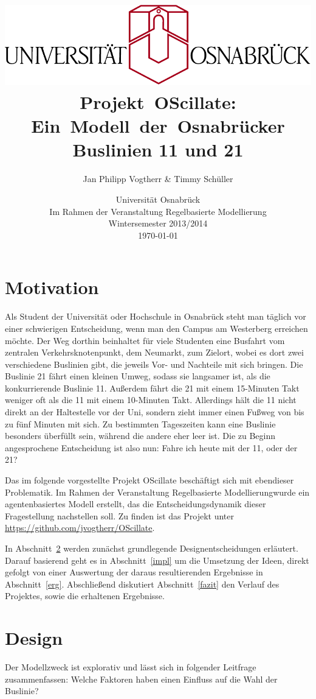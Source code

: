 \documentclass[12pt,a4paper]{scrartcl}
\author{Jan Philipp Vogtherr \& Timmy Schüller\vspace{0.5cm}}
\title{\includegraphics[scale=0.8]{unilogo.pdf}\vspace*{1cm}
\mbox{Projekt OScillate:} \mbox{Ein Modell der Osnabrücker} Buslinien 11 und 21\vspace{0.3cm}}
\date{Universität Osnabrück \\
Im Rahmen der Veranstaltung \glqq Regelbasierte Modellierung\grqq \\
\vspace*{0.4cm}
Wintersemester 2013/2014 \\
\today}
\begin{document}
\maketitle
\thispagestyle{empty}
\newpage
\tableofcontents
\newpage

\section{Motivation}
Als Student der Universität oder Hochschule in Osnabrück steht man täglich vor einer schwierigen Entscheidung, wenn man den Campus am Westerberg erreichen möchte. Der Weg dorthin beinhaltet für viele Studenten eine Busfahrt vom zentralen Verkehrsknotenpunkt, dem Neumarkt, zum Zielort, wobei es dort zwei verschiedene Buslinien gibt, die jeweils Vor- und Nachteile mit sich bringen. Die Buslinie 21 fährt einen kleinen Umweg, sodass sie langsamer ist, als die konkurrierende Buslinie 11. Außerdem fährt die 21 mit einem 15-Minuten Takt weniger oft als die 11 mit einem 10-Minuten Takt. Allerdings hält die 11 nicht direkt an der Haltestelle vor der Uni, sondern zieht immer einen Fußweg von bis zu fünf Minuten mit sich. Zu bestimmten Tageszeiten kann eine Buslinie besonders überfüllt sein, während die andere eher leer ist. Die zu Beginn angesprochene Entscheidung ist also nun: \glqq Fahre ich heute mit der 11, oder der 21?\grqq

Das im folgende vorgestellte Projekt OScillate beschäftigt sich mit ebendieser Problematik. Im Rahmen der Veranstaltung \glqq Regelbasierte Modellierung\grqq wurde ein agentenbasiertes Modell erstellt, das die Entscheidungsdynamik dieser Fragestellung nachstellen soll. Zu finden ist das Projekt unter \url{https://github.com/jvogtherr/OScillate}.

In Abschnitt~\ref{design} werden zunächst grundlegende Designentscheidungen erläutert. Darauf basierend geht es in Abschnitt~\ref{impl} um die Umsetzung der Ideen, direkt gefolgt von einer Auswertung der daraus resultierenden Ergebnisse in Abschnitt~\ref{erg}. Abschließend diskutiert Abschnitt~\ref{fazit} den Verlauf des Projektes, sowie die erhaltenen Ergebnisse.

\section{Design}\label{design}
Der Modellzweck ist explorativ und lässt sich in folgender Leitfrage zusammenfassen: \glqq Welche Faktoren haben einen Einfluss auf die Wahl der Buslinie?\grqq 
\end{document}
